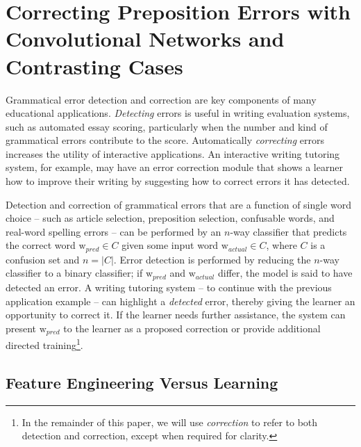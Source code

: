 \chapter{Correcting Preposition Errors with Convolutional Networks and Contrasting Cases}
\label{chap:CorrectingPrepositionErrors}



Grammatical error detection and correction are key components of many educational applications.  \textit{Detecting} errors is useful in writing evaluation systems, such as automated essay scoring, particularly when the number and kind of grammatical errors contribute to the score.  Automatically \textit{correcting} errors increases the utility of interactive applications.  An interactive writing tutoring system, for example, may have an error correction module that shows a learner how to improve their writing by suggesting how to correct errors it has detected.

Detection and correction of grammatical errors that are a function of single word choice -- such as article selection, preposition selection, confusable words, and real-word spelling errors --  can be performed by an $n$-way classifier that predicts the correct word $\text{w}_{pred} \in C$ given some input word $\text{w}_{actual} \in C$, where $C$ is a confusion set and $n = |C|$.  Error detection is performed by reducing the $n$-way classifier to a binary classifier; if $\text{w}_{pred}$ and $\text{w}_{actual}$ differ, the model is said to have detected an error.  A writing tutoring system -- to continue with the previous application example -- can highlight a \textit{detected} error, thereby giving the learner an opportunity to correct it.  If the learner needs further assistance, the system can present $\text{w}_{pred}$ to the learner as a proposed correction or provide additional directed training\footnote{In the remainder of this paper, we will use \textit{correction} to refer to both detection and correction, except when required for clarity.}.  

\section{Feature Engineering Versus Learning}

